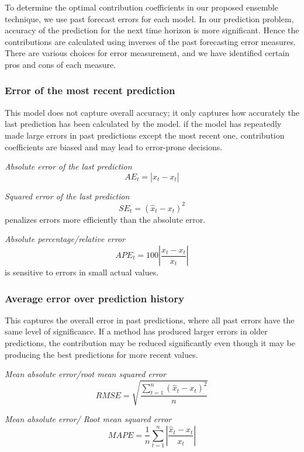 To determine the optimal contribution coefficients in our proposed ensemble technique, we use past forecast errors for each model. In our prediction problem, accuracy of the prediction for the next time horizon is more significant. Hence the contributions are calculated using inverses of the past forecasting error measures. There are various choices for error measurement, and we have identified certain pros and cons of each measure.

\subsubsection{Error of the most recent prediction}

This model does not capture overall accuracy; it only captures how accurately the last prediction has been calculated by the model. if the model has repeatedly made large errors in past predictions except the most recent one, contribution coefficients are biased and may lead to error-prone decisions.

\textit{Absolute error of the last prediction}
$$AE_t=|\hat{x}_t-x_t|$$

\textit{Squared error of the last prediction}
$$SE_t=(\hat{x}_t-x_t)^2$$
penalizes errors more efficiently than the absolute error.

\textit{Absolute percentage/relative error}
$$APE_t=100\left |\frac{\hat{x}_t-x_t}{x_t}  \right |$$
is sensitive to errors in small actual values.

\subsubsection{Average error over prediction history}
This captures the overall error in past predictions, where all past errors have the same level of significance. If a method has produced larger errors in older predictions, the contribution may be reduced significantly even though it may be producing the best predictions for more recent values.

\textit{Mean absolute error/root mean squared error}
$$RMSE=\sqrt{\frac{\sum_{t=1}^{n}(\hat{x}_{t}-x_{t})^{2}}{n}}$$ 

\textit{Mean absolute error/ Root mean squared error}
$$MAPE=\frac{1}{n}\sum_{t=1}^{n}\left | \frac{\hat{x}_{t}-x_{t}}{x_{t}} \right |$$


